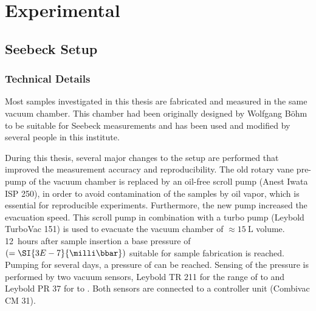 \chapter{Experimental}\label{chap:Exp}
%
%
%
\newpage

\section{Seebeck Setup}\label{sec:Exp}

\subsection{Technical Details}\label{sec:ExpTechDetails}
Most samples investigated in this thesis are fabricated and measured \insitu in the same vacuum chamber. This chamber had been originally designed by Wolfgang Böhm\cite{WolfgangBoehmDiss} to be suitable for \insitu Seebeck measurements and has been used and modified by several people in this institute\cite{AndreBeyerDiplom,MartinPfeifferDiss,BirgPloenningsDiplom,BertMaennigDiss,JanBlochwitzDiss,AndreasNollauDiss,AnsgarWernerDiss,FenghongLiDiss,KentaroHaradaDiss}.

During this thesis, several major changes to the setup are performed that improved the measurement accuracy and reproducibility. The old rotary vane pre-pump of the vacuum chamber is replaced by an oil-free scroll pump (Anest Iwata ISP 250), in order to avoid contamination of the samples by oil vapor, which is essential for reproducible experiments.
Furthermore, the new pump increased the evacuation speed.
This scroll pump in combination with a turbo pump (Leybold TurboVac 151) is used to evacuate the vacuum chamber of $\approx\SI{15}{\liter}$ volume. 12~hours after sample insertion a base pressure of  \mbox{$(=\SI{3E-7}{\milli\bbar})$} suitable for sample fabrication is reached.
Pumping for several days, a pressure of  can be reached. Sensing of the pressure is performed by two vacuum sensors, Leybold TR 211 for the range of  to  and Leybold PR 37 for  to . Both sensors are connected to a controller unit (Combivac CM 31).

